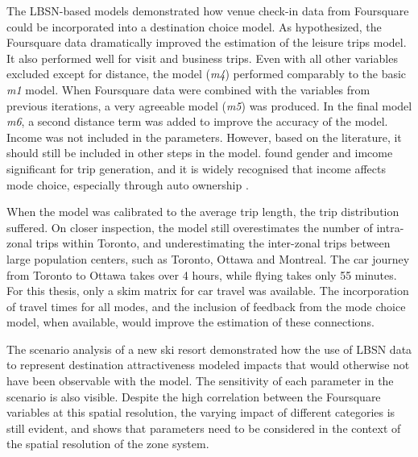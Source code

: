 The LBSN-based models demonstrated how venue check-in data from Foursquare could be incorporated into a destination choice model. As hypothesized, the Foursquare data dramatically improved the estimation of the leisure trips model. It also performed well for visit and business trips. Even with all other variables excluded except for distance, the model (\textit{m4}) performed comparably to the basic \textit{m1} model. When Foursquare data were combined with the variables from previous iterations, a very agreeable model (\textit{m5}) was produced. In the final model \textit{m6}, a second distance term was added to improve the accuracy of the model.
Income was not included in the parameters. However, based on the literature, it should still be included in other steps in the model. \textcite{limtanakool2006participation} found gender and imcome significant for trip generation, and it is widely recognised that income affects mode choice, especially through auto ownership \parencite{ben1974some, miller1998urban, raphael2002car}.

When the model was calibrated to the average trip length, the trip distribution suffered. On closer inspection, the model still overestimates the number of intra-zonal trips within Toronto, and underestimating the inter-zonal trips between large population centers, such as Toronto, Ottawa and Montreal. The car journey from Toronto to Ottawa takes over 4 hours, while flying takes only 55 minutes. For this thesis, only a skim matrix for car travel was available. The incorporation of travel times for all modes, and the inclusion of feedback from the mode choice model, when available, would improve the estimation of these connections.

The scenario analysis of a new ski resort demonstrated how the use of LBSN data to represent destination attractiveness modeled impacts that would otherwise not have been observable with the model. The sensitivity of each parameter in the scenario is also visible. Despite the high correlation between the Foursquare variables at this spatial resolution, the varying impact of different categories is still evident, and shows that parameters need to be considered in the context of the spatial resolution of the zone system. 


